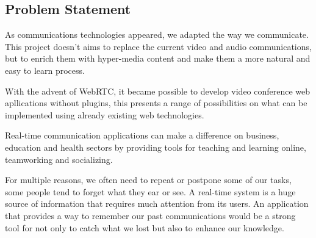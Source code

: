 \subsection{Problem Statement} %

	As communications technologies appeared, we adapted the way we communicate. This project doesn't aims to replace the current video and audio communications, but to enrich them with hyper-media content and make them a more natural and easy to learn process. 

	{\color{blue}With the advent of WebRTC, it became possible to develop video conference web apllications without plugins, this presents a range of possibilities on what can be implemented using already existing web technologies.}
		
    Real-time communication applications can make a difference on business, education and health sectors by providing tools for teaching and learning online, teamworking and socializing.

		For multiple reasons, we often need to repeat or postpone some of our tasks, some people tend to forget what they ear or see.
        A real-time system is a huge source of information that requires much attention from its users. An application that provides a way to remember our past communications would be a strong tool for not only to catch what we lost but also to enhance our knowledge.

		


